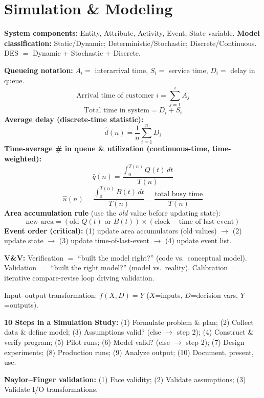 \section{Simulation \& Modeling}

\begin{formulabox}
\textbf{System components:} Entity, Attribute, Activity, Event, State variable. \textbf{Model classification:} Static/Dynamic; Deterministic/Stochastic; Discrete/Continuous. DES $=$ Dynamic + Stochastic + Discrete.

\textbf{Queueing notation:} $A_i=$ interarrival time, $S_i=$ service time, $D_i=$ delay in queue.
\[
\text{Arrival time of customer } i = \sum_{j=1}^i A_j
\]
\[
\text{Total time in system} = D_i+S_i
\]
\textbf{Average delay (discrete-time statistic):}
\[
\hat d(n) = \frac{1}{n}\sum_{i=1}^n D_i
\]
\textbf{Time-average \# in queue \& utilization (continuous-time, time-weighted):}
\[
\hat q(n) = \frac{\int_0^{T(n)}Q(t)\,dt}{T(n)}
\]
\[
\hat u(n) = \frac{\int_0^{T(n)}B(t)\,dt}{T(n)} = \frac{\text{total busy time}}{T(n)}
\]
\textbf{Area accumulation rule} (use the \emph{old} value before updating state):
\[
\text{new area} = (\text{old } Q(t)\text{ or } B(t)) \times (\text{clock} - \text{time of last event})
\]
\textbf{Event order (critical):} (1) update area accumulators (old values) $\to$ (2) update state $\to$ (3) update time-of-last-event $\to$ (4) update event list.

\textbf{V\&V:} Verification $=$ ``built the model right?'' (code vs.\ conceptual model). Validation $=$ ``built the right model?'' (model vs.\ reality). Calibration $=$ iterative compare-revise loop driving validation.

Input--output transformation: $f(X,D)=Y$ ($X$=inputs, $D$=decision vars, $Y$=outputs).

\textbf{10 Steps in a Simulation Study:} (1) Formulate problem \& plan; (2) Collect data \& define model; (3) Assumptions valid? (else $\to$ step 2); (4) Construct \& verify program; (5) Pilot runs; (6) Model valid? (else $\to$ step 2); (7) Design experiments; (8) Production runs; (9) Analyze output; (10) Document, present, use.

\textbf{Naylor--Finger validation:} (1) Face validity; (2) Validate assumptions; (3) Validate I/O transformations.
\end{formulabox}
